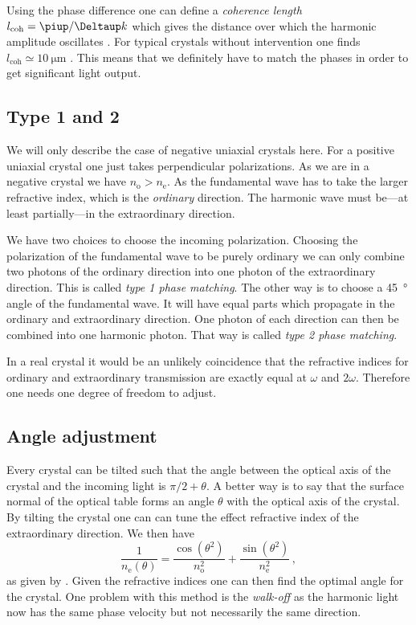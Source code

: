 \documentclass[11pt, english, fleqn, DIV=15, headinclude, BCOR=2cm]{scrreprt}
\begin{document}
Using the phase difference one can define a \emph{coherence length}
$l_\text{coh} = \piup/\Deltaup k$ which gives the distance over which the
harmonic amplitude oscillates
\parencite[Equation~(12.14)]{meschede/optik_licht_laser/2008}. For typical
crystals without intervention one finds $l_\text{coh} \simeq
\SI{10}{\micro\meter}$
\parencite[Section~12.4.1]{meschede/optik_licht_laser/2008}. This means that we
definitely have to match the phases in order to get significant light output.


\subsection{Type 1 and 2}

We will only describe the case of negative uniaxial crystals here. For a
positive uniaxial crystal one just takes perpendicular polarizations. As we are
in a negative crystal we have $n_\mathrm o > n_\mathrm e$. As the fundamental
wave has to take the larger refractive index, which is the \emph{ordinary}
direction. The harmonic wave must be---at least partially---in the
extraordinary direction.

We have two choices to choose the incoming polarization. Choosing the
polarization of the fundamental wave to be purely ordinary we can only combine
two photons of the ordinary direction into one photon of the extraordinary
direction. This is called \emph{type 1 phase matching}. The other way is to
choose a \SI{45}{\degree} angle of the fundamental wave. It will have equal
parts which propagate in the ordinary and extraordinary direction. One photon
of each direction can then be combined into one harmonic photon. That way is
called \emph{type 2 phase matching}.

In a real crystal it would be an unlikely coincidence that the refractive
indices for ordinary and extraordinary transmission are exactly equal at
$\omega$ and $2\omega$. Therefore one needs one degree of freedom to adjust.

\subsection{Angle adjustment}

Every crystal can be tilted such that the angle between the optical axis of the
crystal and the incoming light is $\pi/2 + \theta$. A better way is to say that
the surface normal of the optical table forms an angle $\theta$ with the
optical axis of the crystal. By tilting the crystal one can can tune the
effect refractive index of the extraordinary direction. We then have
\[
    \frac1{n_\mathrm e(\theta)}
    = \frac{\cos(\theta^2)}{n_\mathrm o^2}
    + \frac{\sin(\theta^2)}{n_\mathrm e^2} \,,
\]
as given by \textcite[Equation~(3.31)]{meschede/optik_licht_laser/2008}. Given
the refractive indices one can then find the optimal angle for the crystal. One
problem with this method is the \emph{walk-off} as the harmonic light now has
the same phase velocity but not necessarily the same direction.
\end{document}
